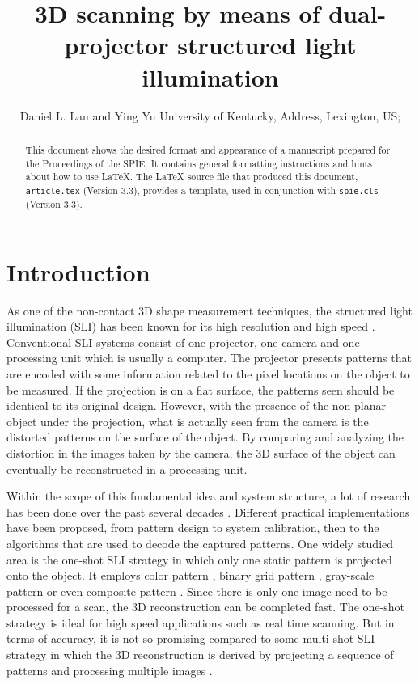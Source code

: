 \documentclass[]{spie}  %
\title{3D scanning by means of dual-projector structured light illumination}
\author{Daniel L. Lau\supit{a} and Ying Yu\supit{a}
\skiplinehalf
\supit{a}University of Kentucky, Address, Lexington, US; \\
}
\begin{document}
 
  \maketitle 

\begin{abstract}
This document shows the desired format and appearance of a manuscript prepared for the Proceedings of the SPIE.  It contains general formatting instructions and hints about how to use LaTeX.  The LaTeX source file that produced this document, {\tt article.tex} (Version 3.3), provides a template, used in conjunction with {\tt spie.cls} (Version 3.3).  
\end{abstract}



\section{Introduction}
\label{sec:intro}  %
As one of the non-contact 3D shape measurement techniques, the structured light illumination (SLI) has been known for its high resolution and high speed \cite{chen00}. Conventional SLI systems consist of one projector, one camera and one processing unit which is usually a computer. The projector presents patterns that are encoded with some information related to the pixel locations on the object to be measured. If the projection is on a flat surface, the patterns seen should be identical to its original design. However, with the presence of the non-planar object under the projection, what is actually seen from the camera is the distorted patterns on the surface of the object. By comparing and analyzing the distortion in the images taken by the camera, the 3D surface of the object can eventually be reconstructed in a processing unit.

Within the scope of this fundamental idea and system structure, a lot of research has been done over the past several decades \cite{geng11}. Different practical implementations have been proposed, from pattern design to system calibration, then to the algorithms that are used to decode the captured patterns. One widely studied area is the one-shot SLI strategy in which only one static pattern is projected onto the object. It employs color pattern \cite{wust91}, binary grid pattern \cite{grin92}, gray-scale pattern \cite{durd98} or even composite pattern \cite{guan08}. Since there is only one image need to be processed for a scan, the 3D reconstruction can be completed fast. The one-shot strategy is ideal for high speed applications such as real time scanning. But in terms of accuracy, it is not so promising compared to some multi-shot SLI strategy in which the 3D reconstruction is derived by projecting a sequence of patterns and processing multiple images \cite{blai03}.
\end{document}
